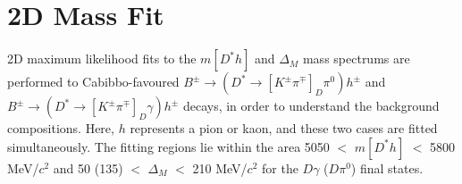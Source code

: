 \documentclass[oneside,12pt]{article}
\begin{document}
{\begin{landscape}
    \begin{table}[]
      \centering
      \caption{{Variables used in the training of the second stage BDT, ranked
          by importance. $\gamma^{1}$ and $\gamma^{2}$ refer to the two daughter photons of the
      $\pi^0$.}}
      \label{table:bdt2TrainingVar}
    \end{table}
  \end{landscape}
}
\vspace{-3mm}
\section{2D Mass Fit} \label{sec:massfit}

2D maximum likelihood fits to the $m[D^*h]$ and $\Delta_M$ mass spectrums are
performed to Cabibbo-favoured $B^{\pm}\rightarrow (D^*\rightarrow
[K^{\pm}\pi^{\mp}]_D\pi^0)h^{\pm}$ and $B^{\pm}\rightarrow (D^*\rightarrow
[K^{\pm}\pi^{\mp}]_D\gamma)h^{\pm}$ decays, in order to understand the
background compositions. Here, $h$ represents a pion or kaon, and these two
cases are fitted simultaneously. The fitting regions lie within the area 5050
$<$ $m[D^*h]$ $<$ 5800 MeV/$c^2$ and 50 (135) $<$ $\Delta_M$ $<$ 210 MeV/$c^2$
for the $D\gamma$ ($D\pi^0$) final states.
\end{document}
